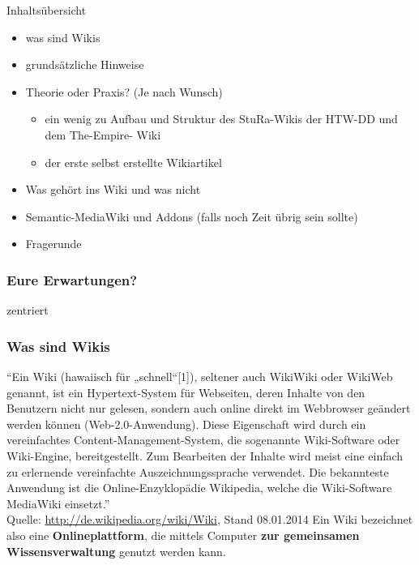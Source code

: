 \documentclass{beamer}
\begin{document}
\begin{frame}{Inhaltsübersicht}
  \begin{itemize}
    \item was sind Wikis
    \item grundsätzliche Hinweise
    \item Theorie oder Praxis? (Je nach Wunsch)
    \begin{itemize}
      \item ein wenig zu Aufbau und Struktur des StuRa-Wikis der HTW-DD und dem The-Empire- Wiki
      \item der erste selbst erstellte Wikiartikel
    \end{itemize}
    \item Was gehört ins Wiki und was nicht
    \item Semantic-MediaWiki und Addons (falls noch Zeit übrig sein sollte)
    \item Fragerunde
  \end{itemize}
\end{frame}


\begin{frame}
  \frametitle{Eure Erwartungen?}
  
  zentriert
  
\end{frame}


\begin{frame}
  \frametitle{Was sind Wikis}
  {\tiny “Ein Wiki (hawaiisch für „schnell“[1]), seltener auch WikiWiki
  oder WikiWeb genannt, ist ein Hypertext-System für Webseiten, deren
  Inhalte von den Benutzern nicht nur gelesen, sondern auch online direkt
  im Webbrowser geändert werden können (Web-2.0-Anwendung). Diese
  Eigenschaft wird durch ein vereinfachtes Content-Management-System, die
  sogenannte Wiki-Software oder Wiki-Engine, bereitgestellt. Zum
  Bearbeiten der Inhalte wird meist eine einfach zu erlernende
  vereinfachte Auszeichnungssprache verwendet. Die bekannteste Anwendung
  ist die Online-Enzyklopädie Wikipedia, welche die Wiki-Software
  MediaWiki einsetzt.” \\ Quelle: \url{http://de.wikipedia.org/wiki/Wiki}, Stand 08.01.2014}
  Ein Wiki bezeichnet also eine \textbf{Onlineplattform}, die mittels
  Computer \textbf{zur gemeinsamen Wissensverwaltung} genutzt werden
  kann.
\end{frame}
\end{document}
